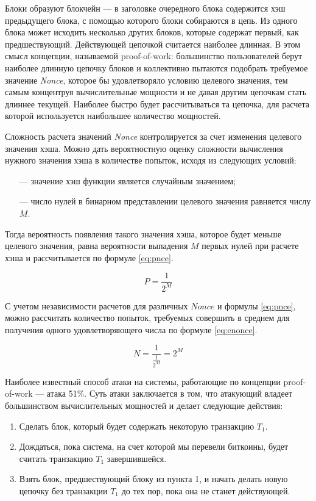 Блоки образуют блокчейн --- в заголовке очередного блока содержится хэш предыдущего блока, с помощью которого блоки собираются в цепь. Из одного блока может исходить несколько других блоков, которые содержат первый, как предшествующий. Действующей цепочкой считается наиболее длинная. В этом смысл концепции, называемой proof-of-work: большинство пользователей берут наиболее длинную цепочку блоков и коллективно пытаются подобрать требуемое значение \textit{Nonce}, которое бы удовлетворяло условию целевого значения, тем самым концентруя вычислительные мощности и не давая другим цепочкам стать длиннее текущей. Наиболее быстро будет рассчитываться та цепочка, для расчета которой используется наибольшее количество мощностей.

Сложность расчета значений \textit{Nonce} контролируется за счет изменения целевого значения хэша. Можно дать вероятностную оценку сложности вычисления нужного значения хэша в количестве попыток, исходя из следующих условий:
\begin{itemize}
    \item[---] значение хэш функции является случайным значением;
    \item[---] число нулей в бинарном представлении целевого значения равняется числу $M$.
\end{itemize}

Тогда вероятность появления такого значения хэша, которое будет меньше целевого значения, равна вероятности выпадения $M$ первых нулей при расчете хэша и рассчитывается по формуле \ref{eq:pnce}.

\begin{equation}
    \label{eq:pnce}
    P = \frac{1}{2^M}
\end{equation}

С учетом независимости расчетов для различных $Nonce$ и формулы \ref{eq:pnce}, можно рассчитать количество попыток, требуемых совершить в среднем для получения одного удовлетворяющего числа по формуле \ref{eq:enonce}.

\begin{equation}
    \label{eq:enonce}
    N = \frac{1}{\frac{1}{2^M}} = 2^M
\end{equation}

Наиболее известный способ атаки на системы, работающие по концепции proof-of-work --- атака 51\%. Суть атаки заключается в том, что атакующий владеет большинством вычислительных мощностей и делает следующие действия:
\begin{enumerate}
    \item Сделать блок, который будет содержать некоторую транзакцию $T_1$.
    \item Дождаться, пока система, на счет которой мы перевели биткоины, будет считать транзакцию $T_1$ завершившейся.
    \item Взять блок, предшествующий блоку из пункта 1, и начать делать новую цепочку без транзакции $T_1$ до тех пор, пока она не станет действующей.
\end{enumerate}

